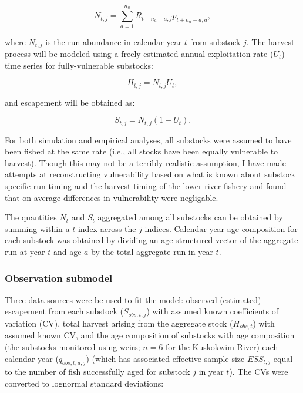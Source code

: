 \documentclass[12pt,]{book}
\theoremstyle{definition}
\theoremstyle{definition}
\theoremstyle{definition}
\theoremstyle{remark}
\begin{document}
\begin{equation}
  N_{t,j}=\sum_{a=1}^{n_a} R_{t+n_a-a,j} p_{t+n_a-a,a},
  \label{eq:tsm-get-N}
\end{equation}

\noindent
where \(N_{t,j}\) is the run abundance in calendar year \(t\) from
substock \(j\). The harvest process will be modeled using a freely
estimated annual exploitation rate (\(U_t\)) time series for
fully-vulnerable substocks:

\begin{equation}
  H_{t,j}=N_{t,j} U_t,
  \label{eq:tsm-get-H}
\end{equation}

\noindent
and escapement will be obtained as:

\begin{equation}
  S_{t,j}=N_{t,j} (1 - U_t).
  \label{eq:tsm-get-S}
\end{equation}

\noindent
For both simulation and empirical analyses, all substocks were assumed
to have been fished at the same rate (i.e., all stocks have been equally
vulnerable to harvest). Though this may not be a terribly realistic
assumption, I have made attempts at reconstructing vulnerability based
on what is known about substock specific run timing and the harvest
timing of the lower river fishery and found that on average differences
in vulnerability were negligable.

The quantities \(N_t\) and \(S_t\) aggregated among all substocks can be
obtained by summing within a \(t\) index across the \(j\) indices.
Calendar year age composition for each substock was obtained by dividing
an age-structured vector of the aggregate run at year \(t\) and age
\(a\) by the total aggregate run in year \(t\).

\subsubsection{Observation submodel}\label{ssm-obs-model}

\noindent
Three data sources were be used to fit the model: observed (estimated)
escapement from each substock (\(S_{obs,t,j}\)) with assumed known
coefficients of variation (CV), total harvest arising from the aggregate
stock (\(H_{obs,t}\)) with assumed known CV, and the age composition of
substocks with age composition (the substocks monitored using weirs;
\(n = 6\) for the Kuskokwim River) each calendar year
(\(q_{obs,t,a,j}\)) (which has associated effective sample size
\(ESS_{t,j}\) equal to the number of fish successfully aged for substock
\(j\) in year \(t\)). The CVs were converted to lognormal standard
deviations:
\end{document}
